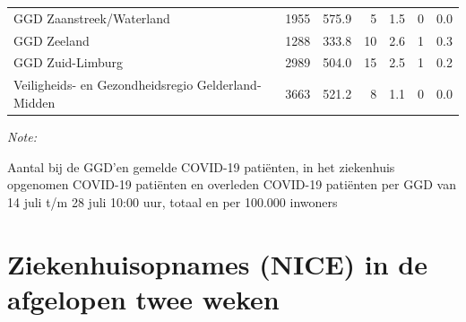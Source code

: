 \documentclass[
  english,
  man,floatsintext]{apa6}
\begin{document}
\begin{table}
\begin{threeparttable}
\begin{tabular}{lrrrrrr}
GGD Zaanstreek/Waterland & 1955 & 575.9 & 5 & 1.5 & 0 & 0.0\\
GGD Zeeland & 1288 & 333.8 & 10 & 2.6 & 1 & 0.3\\
GGD Zuid-Limburg & 2989 & 504.0 & 15 & 2.5 & 1 & 0.2\\
Veiligheids- en Gezondheidsregio Gelderland-Midden & 3663 & 521.2 & 8 & 1.1 & 0 & 0.0\\
\bottomrule
\end{tabular}
\begin{tablenotes}
\item \textit{Note: } 
\item Aantal bij de GGD’en gemelde COVID-19 patiënten, in het ziekenhuis opgenomen COVID-19 patiënten en overleden COVID-19 patiënten per GGD van 14 juli t/m 28 juli 10:00 uur, totaal en per 100.000 inwoners
\end{tablenotes}
\end{threeparttable}
\endgroup{}
\end{table}

\newpage

\hypertarget{ziekenhuisopnames-nice-in-de-afgelopen-twee-weken}{%
\section{Ziekenhuisopnames (NICE) in de afgelopen twee weken}\label{ziekenhuisopnames-nice-in-de-afgelopen-twee-weken}}
\end{document}
